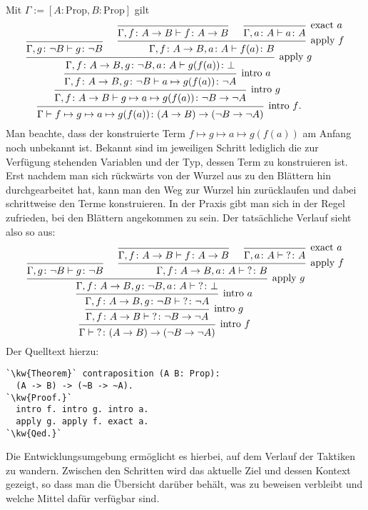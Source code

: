 Mit $\Gamma:=[A\colon\mathrm{Prop},B\colon\mathrm{Prop}]$ gilt
\[\begin{prooftree}
        \infer0{\Gamma,g\colon\lnot B\vdash g\colon\lnot B}
          \infer0{\Gamma,f\colon A\to B\vdash f\colon A\to B}
          \infer0[exact $a$]{\Gamma,a\colon A\vdash a\colon A}
        \infer2[apply $f$]{\Gamma,f\colon A\to B, a\colon A\vdash f(a)\colon B}
      \infer2[apply $g$]{\Gamma, f\colon A\to B, g\colon\lnot B, a\colon A\vdash g(f(a))\colon\bot}
    \infer1[intro $a$]{\Gamma, f\colon A\to B, g\colon\lnot B\vdash a\mapsto g(f(a))\colon \lnot A}
  \infer1[intro $g$]{\Gamma, f\colon A\to B\vdash g\mapsto a\mapsto g(f(a))\colon \lnot B\to\lnot A}
\infer1[intro $f${\normalsize .}]{\Gamma\vdash f\mapsto g\mapsto a\mapsto g(f(a))\colon (A\to B)\to (\lnot B\to\lnot A)}
\end{prooftree}\]
Man beachte, dass der konstruierte Term $f\mapsto g\mapsto a\mapsto g(f(a))$ am Anfang noch
unbekannt ist. Bekannt sind im jeweiligen Schritt lediglich die zur
Verfügung stehenden Variablen und der Typ, dessen Term zu konstruieren
ist. Erst nachdem man sich rückwärts von der Wurzel aus zu den
Blättern hin durchgearbeitet hat, kann man den Weg zur Wurzel hin
zurücklaufen und dabei schrittweise den Terme konstruieren.
In der Praxis gibt man sich in der Regel zufrieden, bei den Blättern
angekommen zu sein. Der tatsächliche Verlauf sieht also so aus:
\[\begin{prooftree}
        \infer0{\Gamma,g\colon\lnot B\vdash g\colon\lnot B}
          \infer0{\Gamma,f\colon A\to B\vdash f\colon A\to B}
          \infer0[exact $a$]{\Gamma,a\colon A\vdash {?}\colon A}
        \infer2[apply $f$]{\Gamma,f\colon A\to B, a\colon A\vdash {?}\colon B}
      \infer2[apply $g$]{\Gamma, f\colon A\to B, g\colon\lnot B, a\colon A\vdash {?}\colon\bot}
    \infer1[intro $a$]{\Gamma, f\colon A\to B, g\colon\lnot B\vdash {?}\colon \lnot A}
  \infer1[intro $g$]{\Gamma, f\colon A\to B\vdash {?}\colon \lnot B\to\lnot A}
\infer1[intro $f$]{\Gamma\vdash {?}\colon (A\to B)\to (\lnot B\to\lnot A)}
\end{prooftree}\]
Der Quelltext hierzu:
\begin{lstlisting}[escapechar=`, xleftmargin=\mathindent]
`\kw{Theorem}` contraposition (A B: Prop):
  (A -> B) -> (~B -> ~A).
`\kw{Proof.}`
  intro f. intro g. intro a.
  apply g. apply f. exact a.
`\kw{Qed.}`
\end{lstlisting}
Die Entwicklungsumgebung ermöglicht es hierbei, auf dem Verlauf der
Taktiken zu wandern. Zwischen den Schritten wird das aktuelle Ziel und
dessen Kontext gezeigt, so dass man die Übersicht darüber behält,
was zu beweisen verbleibt und welche Mittel dafür verfügbar sind.

